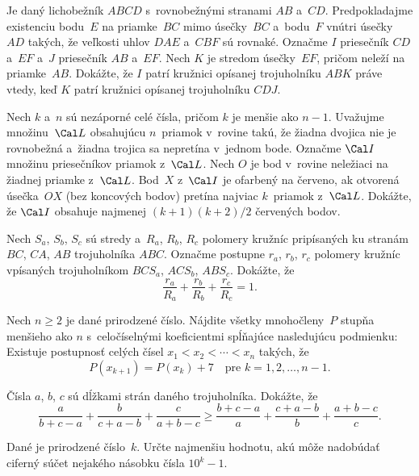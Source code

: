 {%
Je daný lichobežník $ABCD$ s~rovnobežnými stranami $AB$ a~$CD$.
Predpokladajme existenciu bodu~$E$ na priamke~$BC$ mimo úsečky~$BC$ a~bodu~$F$
vnútri úsečky~$AD$ takých, že veľkosti uhlov $DAE$ a~$CBF$ sú rovnaké.
Označme $I$ priesečník $CD$ a~$EF$ a~$J$ priesečník $AB$ a~$EF$. Nech
$K$ je stredom úsečky~$EF$, pričom neleží na priamke~$AB$.
Dokážte, že $I$ patrí kružnici opísanej trojuholníku $ABK$ práve vtedy, keď $K$
patrí kružnici opísanej trojuholníku $CDJ$.}

{%
Nech $k$ a~$n$ sú nezáporné celé čísla, pričom $k$ je menšie ako $n-1$.
Uvažujme množinu~$\Cal L$ obsahujúcu $n$~priamok v~rovine takú, že žiadna
dvojica nie je rovnobežná a~žiadna trojica sa nepretína v~jednom bode.
Označme $\Cal I$ množinu priesečníkov priamok z~$\Cal L$. Nech $O$ je bod v~rovine
neležiaci na žiadnej priamke z~$\Cal L$. Bod~$X$ z~$\Cal I$ je ofarbený na červeno, ak otvorená úsečka~$OX$ (bez koncových bodov) pretína najviac $k$~priamok z~$\Cal L$. Dokážte, že $\Cal I$ obsahuje najmenej
$(k+1)(k+2)/2$ červených bodov.}

{%
Nech $S_a$, $S_b$, $S_c$ sú stredy a~$R_a$, $R_b$, $R_c$ polomery kružníc pripísaných ku stranám $BC$, $CA$, $AB$ trojuholníka $ABC$. Označme postupne $r_a$, $r_b$, $r_c$ polomery kružníc vpísaných trojuholníkom $BCS_a$, $ACS_b$, $ABS_c$. Dokážte, že
$$
\frac{r_a}{R_a} + \frac{r_b}{R_b} + \frac{r_c}{R_c} = 1.
$$}

{%
Nech $n\ge2$ je dané prirodzené číslo. Nájdite všetky mnohočleny~$P$ stupňa menšieho ako $n$ s~celočíselnými koeficientmi spĺňajúce nasledujúcu podmienku: Existuje postupnosť celých čísel $x_1<x_2<\cdots<x_n$ takých, že
$$
P(x_{k+1})=P(x_k)+7\quad\text{pre $k=1,2,\dots,n-1$.}
$$}

{%
Čísla $a$, $b$, $c$ sú dĺžkami strán daného trojuholníka. Dokážte, že
$$
\frac{a}{b+c-a}+\frac{b}{c+a-b}+\frac{c}{a+b-c}\ge\frac{b+c-a}{a}+\frac{c+a-b}{b}+\frac{a+b-c}{c}.
$$}

{%
Dané je prirodzené číslo~$k$. Určte najmenšiu hodnotu, akú môže nadobúdať ciferný súčet nejakého násobku čísla $10^k-1$.}

